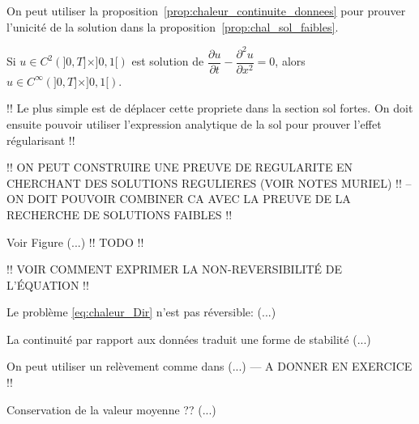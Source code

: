 \documentclass[12pt,a4paper,twoside]{article}
\begin{document}
\begin{remark}
  On peut utiliser la proposition~\ref{prop:chaleur_continuite_donnees}
  pour prouver l'unicit\'e de la solution dans la
  proposition~\ref{prop:chal_sol_faibles}.
\end{remark}

\begin{proposition}
  Si $u \in C^2(]0,T] \times ]0,1[)$ est solution de
  $\dfrac{\partial u}{\partial t} - \dfrac{\partial^2 u}{\partial x^2} = 0$,
  alors $u \in C^{\infty}(]0,T] \times ]0,1[)$.
\end{proposition}
!! Le plus simple est de d\'eplacer cette propriete dans la section sol fortes.
On doit ensuite pouvoir utiliser l'expression analytique de la sol
pour prouver l'effet r\'egularisant !!

!! ON PEUT CONSTRUIRE UNE PREUVE DE REGULARITE EN CHERCHANT DES SOLUTIONS REGULIERES
(VOIR NOTES MURIEL) !! 
-- ON DOIT POUVOIR COMBINER CA AVEC LA PREUVE DE LA RECHERCHE DE SOLUTIONS FAIBLES !!

Voir Figure (...) !! TODO !!


!! VOIR COMMENT EXPRIMER LA NON-REVERSIBILIT\'E DE L'\'EQUATION !!

\begin{proposition}
  Le probl\`eme \eqref{eq:chaleur_Dir} n'est pas r\'eversible:
  (...)
\end{proposition}




\begin{remark}
  La continuit\'e par rapport aux donn\'ees traduit une forme de stabilit\'e
  (...)
\end{remark}

\begin{remark}
  On peut utiliser un rel\`evement comme dans (...) --- A DONNER EN EXERCICE !!
\end{remark}

\begin{remark}
  Conservation de la valeur moyenne ??
  (...)
\end{remark}
\end{document}

